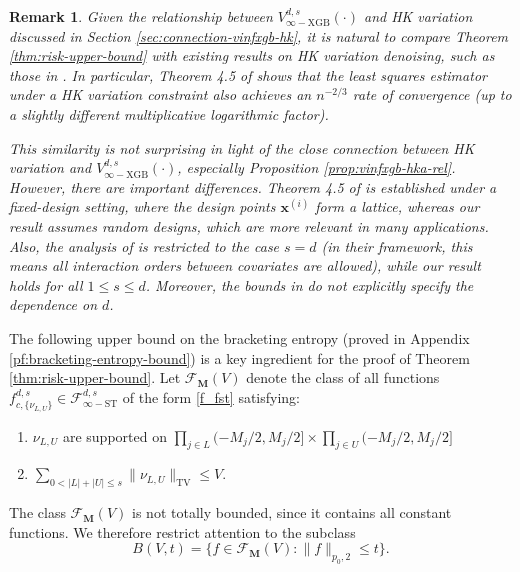 \documentclass[10pt]{article}
\newtheorem{remark}{Remark}
\newcommand{\F}{{\mathcal{F}}}
\newcommand{\fstinf}{{\mathcal{F}^{d, s}_{\infty-\text{ST}}}}
\newcommand{\vinfxgb}{{V^{d, s}_{\infty-\text{XGB}}}}
\newcommand{\fcnu}{{f^{d, s}_{c, \{\nu_{L, U}\}}}}
\newcommand{\xbf}{{\mathbf{x}}}
\newcommand{\Mbf}{{\mathbf{M}}}
\begin{document}
\begin{remark}
    Given the relationship between $\vinfxgb(\cdot)$ and 
    HK variation discussed in 
    Section \ref{sec:connection-vinfxgb-hk}, 
    it is natural to compare Theorem \ref{thm:risk-upper-bound} 
    with existing results on HK variation denoising, such as 
    those in \citet{fang2021multivariate}. In particular, 
    Theorem 4.5 of \cite{fang2021multivariate} shows that the 
    least squares estimator under a HK variation constraint 
    also achieves an $n^{-2/3}$ rate of convergence (up to a 
    slightly different multiplicative logarithmic factor). 

    This similarity is not surprising in light of the 
    close connection between HK variation and $\vinfxgb(\cdot)$, 
    especially Proposition \ref{prop:vinfxgb-hka-rel}. However, 
    there are important differences. Theorem 4.5 of 
    \cite{fang2021multivariate} is established under a 
    fixed-design setting, where the design points $\xbf^{(i)}$ 
    form a lattice, whereas our result assumes random designs, 
    which are more relevant in many applications. Also, 
    the analysis of \cite{fang2021multivariate} is restricted to the
    case $s = d$ (in their framework, this means all interaction
    orders between covariates are allowed), while our result holds
    for all $1 \le s \le d$. Moreover, the bounds in
    \cite{fang2021multivariate} do not explicitly specify the 
    dependence on $d$. 
\end{remark}

The following upper bound on the bracketing entropy 
(proved in Appendix \ref{pf:bracketing-entropy-bound}) 
is a key ingredient for the proof of 
Theorem \ref{thm:risk-upper-bound}. Let $\F_{\Mbf}(V)$ denote the 
class of all functions $\fcnu \in \fstinf$ of the form \eqref{f_fst} 
satisfying: 
\begin{enumerate}[label = (\alph*)]
    \item $\nu_{L, U}$ are supported on 
    $\prod_{j \in L} (-M_j/2, M_j/2] 
    \times \prod_{j \in U} (-M_j/2, M_j/2]$
    \item $\sum_{0 < |L| + |U| \le s} \|\nu_{L, U}\|_{\text{TV}} 
    \le V$. 
\end{enumerate}
The class $\F_{\Mbf}(V)$ is not totally bounded, since it contains all
constant functions. We therefore restrict attention to the subclass
\begin{equation*}
    B(V, t) = \{f \in \F_{\Mbf}(V) : \|f\|_{p_0, 2} \le t\}. 
\end{equation*}
\end{document}
